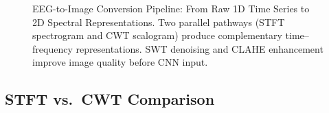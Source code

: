 \begin{figure}[!htbp]
{%
}%
\caption[EEG-to-image conversion pipeline]{EEG-to-Image Conversion Pipeline: From Raw 1D Time Series to 2D Spectral Representations. Two parallel pathways (STFT spectrogram and CWT scalogram) produce complementary time--frequency representations. SWT denoising and CLAHE enhancement improve image quality before CNN input.}
\label{fig:eeg_to_image_pipeline}
\end{figure}

\subsection{STFT vs.\ CWT Comparison}

